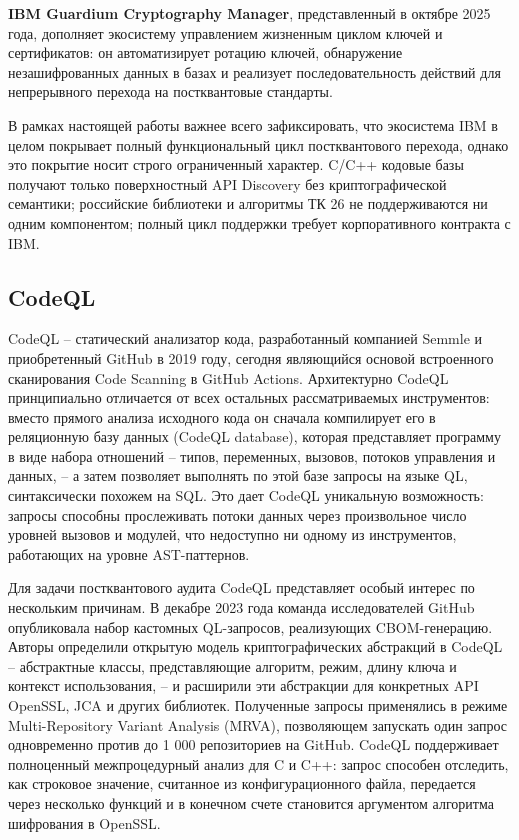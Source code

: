 \documentclass{itmo-vkr}
\begin{document}
	\textbf{IBM Guardium Cryptography Manager}, представленный в октябре 2025 года, дополняет экосистему управлением жизненным циклом ключей и сертификатов: он автоматизирует ротацию ключей, обнаружение незашифрованных данных в базах и реализует последовательность действий для непрерывного перехода на постквантовые стандарты.
	
	В рамках настоящей работы важнее всего зафиксировать, что экосистема IBM в целом покрывает полный функциональный цикл постквантового перехода, однако это покрытие носит строго ограниченный характер. C/C++ кодовые базы получают только поверхностный API Discovery без криптографической семантики; российские библиотеки и алгоритмы ТК 26 не поддерживаются ни одним компонентом; полный цикл поддержки требует корпоративного контракта с IBM.
	
	\subsection{CodeQL}
	
	CodeQL -- статический анализатор кода, разработанный компанией Semmle и приобретенный GitHub в 2019 году, сегодня являющийся основой встроенного сканирования Code Scanning в GitHub Actions. Архитектурно CodeQL принципиально отличается от всех остальных рассматриваемых инструментов: вместо прямого анализа исходного кода он сначала компилирует его в реляционную базу данных (CodeQL database), которая представляет программу в виде набора отношений -- типов, переменных, вызовов, потоков управления и данных, -- а затем позволяет выполнять по этой базе запросы на языке QL, синтаксически похожем на SQL. Это дает CodeQL уникальную возможность: запросы способны прослеживать потоки данных через произвольное число уровней вызовов и модулей, что недоступно ни одному из инструментов, работающих на уровне AST-паттернов.
	
	Для задачи постквантового аудита CodeQL представляет особый интерес по нескольким причинам. В декабре 2023 года команда исследователей GitHub опубликовала набор кастомных QL-запросов, реализующих CBOM-генерацию. Авторы определили открытую модель криптографических абстракций в CodeQL -- абстрактные классы, представляющие алгоритм, режим, длину ключа и контекст использования, -- и расширили эти абстракции для конкретных API OpenSSL, JCA и других библиотек. Полученные запросы применялись в режиме Multi-Repository Variant Analysis (MRVA), позволяющем запускать один запрос одновременно против до 1 000 репозиториев на GitHub. CodeQL поддерживает полноценный межпроцедурный анализ для C и C++: запрос способен отследить, как строковое значение, считанное из конфигурационного файла, передается через несколько функций и в конечном счете становится аргументом алгоритма шифрования в OpenSSL.
	
\end{document}
